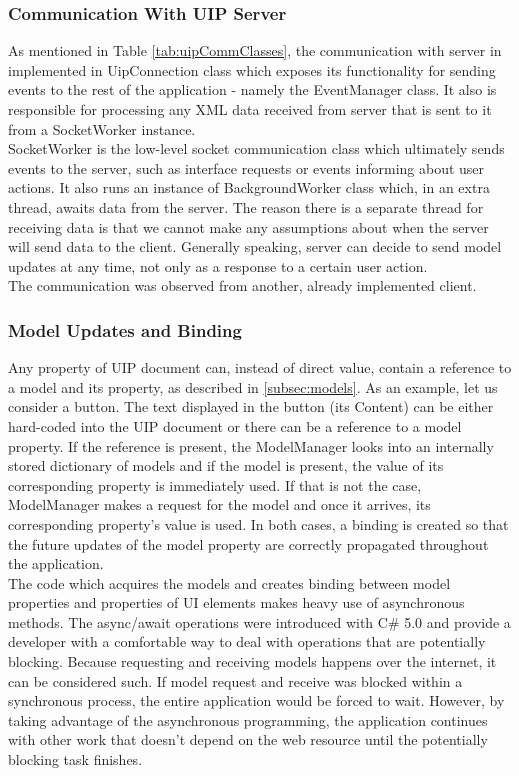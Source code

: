 \subsubsection{Communication With UIP Server}
As mentioned in Table \ref{tab:uipCommClasses}, the communication with server in implemented in UipConnection class which exposes its functionality for sending events to the rest of the application - namely the EventManager class. It also is responsible for processing any XML data received from server that is sent to it from a SocketWorker instance.
\\
SocketWorker is the low-level socket communication class which ultimately sends events to the server, such as interface requests or events informing about user actions. It also runs an instance of BackgroundWorker class which, in an extra thread, awaits data from the server. The reason there is a separate thread for receiving data is that we cannot make any assumptions about when the server will send data to the client. Generally speaking, server can decide to send model updates at any time, not only as a response to a certain user action.\\
The communication was observed from another, already implemented client.

\subsubsection{Model Updates and Binding}
Any property of UIP document can, instead of direct value, contain a reference to a model and its property, as described in \ref{subsec:models}. As an example, let us consider a button. The text displayed in the button (its Content) can be either hard-coded into the UIP document or there can be a reference to a model property. If the reference is present, the ModelManager looks into an internally stored dictionary of models and if the model is present, the value of its corresponding property is immediately used. If that is not the case, ModelManager makes a request for the model and once it arrives, its corresponding property's value is used. In both cases, a binding is created so that the future updates of the model property are correctly propagated throughout the application.\\The code which acquires the models and creates binding between model properties and properties of UI elements makes heavy use of asynchronous methods. The async/await operations were introduced with C\# 5.0  and provide a developer with a comfortable way to deal with operations that are potentially blocking. Because requesting and receiving models happens over the internet, it can be considered such. If model request and receive was blocked within a synchronous process, the entire application would be forced to wait. However, by taking advantage of the asynchronous programming, the application continues with other work that doesn't depend on the web resource until the potentially blocking task finishes.

